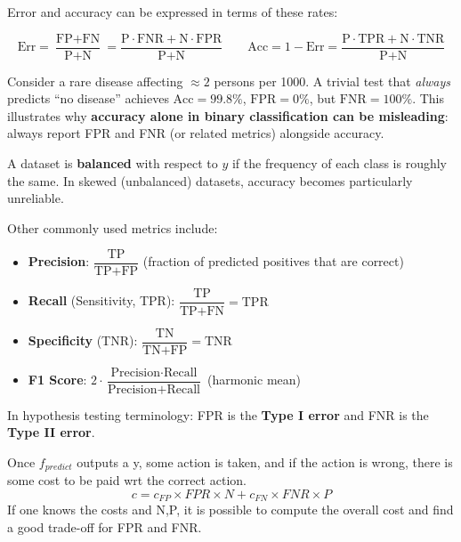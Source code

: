 \medskip

Error and accuracy can be expressed in terms of these rates:

$$\text{Err} = \frac{\text{FP} + \text{FN}}{\text{P} + \text{N}} = \frac{\text{P} \cdot \text{FNR} + \text{N} \cdot \text{FPR}}{\text{P} + \text{N}} \qquad \text{Acc} = 1 - \text{Err} = \frac{\text{P} \cdot \text{TPR} + \text{N} \cdot \text{TNR}}{\text{P} + \text{N}}$$

\begin{warningblock}
    Consider a rare disease affecting $\approx 2$ persons per 1000. A trivial test that \textit{always} predicts ``no disease'' achieves $\text{Acc} = 99.8\%$, $\text{FPR} = 0\%$, but $\text{FNR} = 100\%$. This illustrates why \textbf{accuracy alone in binary classification can be misleading}: always report FPR and FNR (or related metrics) alongside accuracy.
\end{warningblock}

\begin{definitionblock}
    A dataset is \textbf{balanced} with respect to $y$ if the frequency of each class is roughly the same. In skewed (unbalanced) datasets, accuracy becomes particularly unreliable.
\end{definitionblock}

Other commonly used metrics include:
\begin{itemize}
    \item \textbf{Precision}: $\dfrac{\text{TP}}{\text{TP} + \text{FP}}$ (fraction of predicted positives that are correct)
    \item \textbf{Recall} (Sensitivity, TPR): $\dfrac{\text{TP}}{\text{TP} + \text{FN}} = \text{TPR}$
    \item \textbf{Specificity} (TNR): $\dfrac{\text{TN}}{\text{TN} + \text{FP}} = \text{TNR}$
    \item \textbf{F1 Score}: $2 \cdot \dfrac{\text{Precision} \cdot \text{Recall}}{\text{Precision} + \text{Recall}}$ (harmonic mean)
\end{itemize}

\medskip

In hypothesis testing terminology: FPR is the \textbf{Type I error} and FNR is the \textbf{Type II error}.

\begin{warningblock}
    Once $f_{predict}$ outputs a y, some action is taken, and if the action is wrong, there is some cost to be paid wrt the correct action.
    $$c = c_{FP} \times FPR \times N + c_{FN} \times FNR \times P$$
    If one knows the costs and N,P, it is possible to compute the overall cost and find a good trade-off for FPR and FNR.
\end{warningblock}

